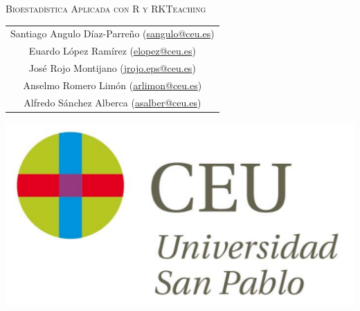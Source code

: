 \begin{titlepage}
\vspace*{5cm}
\par
\centering
\normalfont\fontsize{30}{30}\selectfont
\textsc{\color{blueceu}Bioestadística Aplicada con R y RKTeaching}
\par  
\vspace*{3cm}
{\Large
\begin{tabular}{c}
Santiago Angulo Díaz-Parreño (\url{sangulo@ceu.es})\\
Euardo López Ramírez (\url{elopez@ceu.es})\\
José Rojo Montijano (\url{jrojo.eps@ceu.es})\\
Anselmo Romero Limón (\url{arlimon@ceu.es})\\
Alfredo Sánchez Alberca (\url{asalber@ceu.es})
\end{tabular}
}
\par
\vfill
\includegraphics[scale=0.3]{img/logo_uspceu_01}
\end{titlepage}

